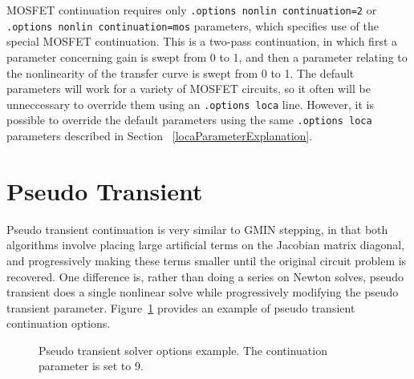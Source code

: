 MOSFET continuation requires only \texttt{.options nonlin continuation=2}
or \texttt{.options nonlin continuation=mos} parameters, which
specifies use of the special MOSFET continuation.  This is a two-pass
continuation, in which first a parameter concerning gain is swept from 0
to 1, and then a parameter relating to the nonlinearity of the
transfer curve is swept from 0 to 1.  The default parameters will work
for a variety of MOSFET circuits, so it often will be unneccessary to
override them using an \texttt{.options loca} line. However, it is
possible to override the default parameters using the same
\texttt{.options loca} parameters described in Section
~\ref{locaParameterExplanation}.


\newpage 
\section{Pseudo Transient}
\label{continuation_pseudotran}

Pseudo transient continuation is very similar to GMIN stepping, in
that both algorithms involve placing large artificial terms on the
Jacobian matrix diagonal, and progressively making these terms smaller
until the original circuit problem is recovered.  One difference is,
rather than doing a series on Newton solves, pseudo transient does a
single nonlinear solve while progressively modifying the pseudo
transient parameter. Figure~\ref{pseudo_netlist_frag} provides an
example of pseudo transient continuation options.

\begin{figure}[htbp]
\begin{centering}
\caption [Pseudo transient solver options example.]{Pseudo transient solver options example. The continuation parameter is set to 9. \label{pseudo_netlist_frag}} 
\end{centering}
\end{figure}

